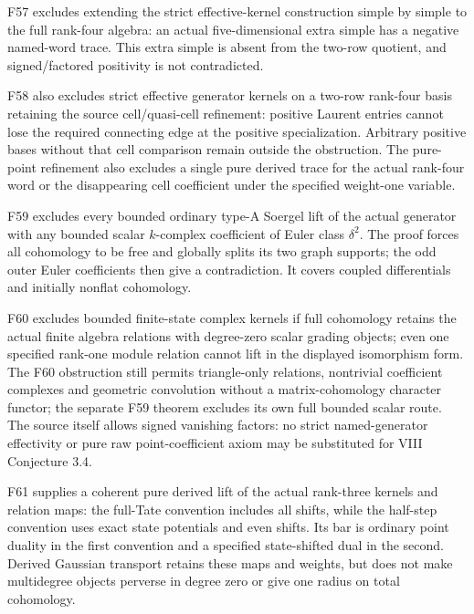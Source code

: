 \documentclass[11pt,a4paper]{article}
\theoremstyle{named}\newtheorem{finding}{Finding}[section]
\theoremstyle{definition}\newtheorem{definition}[finding]{Definition}
\theoremstyle{remark}\newtheorem{remark}[finding]{Remark}
\begin{document}
F57 excludes extending the strict effective-kernel construction simple by simple to the full rank-four algebra: an actual five-dimensional extra simple has a negative named-word trace. This extra simple is absent from the two-row quotient, and signed/factored positivity is not contradicted.

F58 also excludes strict effective generator kernels on a two-row rank-four basis retaining the source cell/quasi-cell refinement: positive Laurent entries cannot lose the required connecting edge at the positive specialization. Arbitrary positive bases without that cell comparison remain outside the obstruction. The pure-point refinement also excludes a single pure derived trace for the actual rank-four word or the disappearing cell coefficient under the specified weight-one variable.

F59 excludes every bounded ordinary type-A Soergel lift of the actual generator with any bounded scalar $k$-complex coefficient of Euler class $\delta^2$. The proof forces all cohomology to be free and globally splits its two graph supports; the odd outer Euler coefficients then give a contradiction. It covers coupled differentials and initially nonflat cohomology.

F60 excludes bounded finite-state complex kernels if full cohomology retains the actual finite algebra relations with degree-zero scalar grading objects; even one specified rank-one module relation cannot lift in the displayed isomorphism form. The F60 obstruction still permits triangle-only relations, nontrivial coefficient complexes and geometric convolution without a matrix-cohomology character functor; the separate F59 theorem excludes its own full bounded scalar route. The source itself allows signed vanishing factors: no strict named-generator effectivity or pure raw point-coefficient axiom may be substituted for VIII Conjecture 3.4.

F61 supplies a coherent pure derived lift of the actual rank-three kernels and relation maps: the full-Tate convention includes all shifts, while the half-step convention uses exact state potentials and even shifts. Its bar is ordinary point duality in the first convention and a specified state-shifted dual in the second. Derived Gaussian transport retains these maps and weights, but does not make multidegree objects perverse in degree zero or give one radius on total cohomology.
\end{document}
